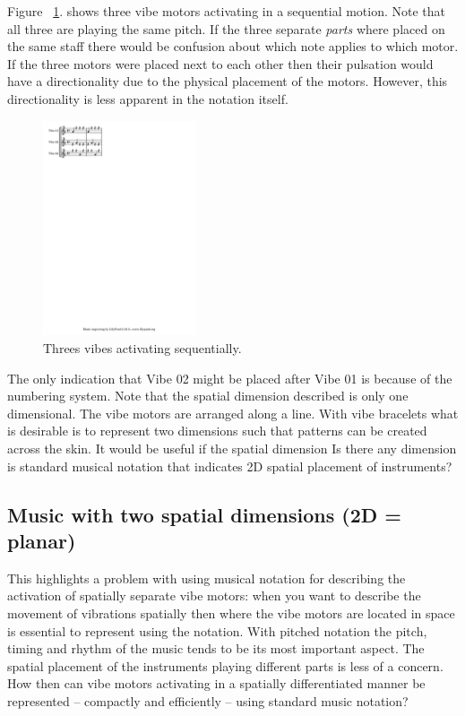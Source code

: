 \documentclass[a4paper, twocolumn]{article}
\begin{document}
Figure ~\ref{fig:arrowsMoving01}. shows three vibe motors activating in a sequential motion. Note that all three are playing the same pitch. If the three separate \textit{parts} where placed on the same staff there would be confusion about which note applies to which motor. If the three motors were placed next to each other then their pulsation would have a directionality due to the physical placement of the motors. However, this directionality is less apparent in the notation itself. 
\\

\begin{figure}[htb]
    \begin{center}
        \includegraphics[width=0.4\textwidth]{graphics/arrowsMoving-01.pdf}
    \end{center}
    \caption{Threes vibes activating sequentially.\label{fig:arrowsMoving01}}
\end{figure}

The only indication that Vibe 02 might be placed after Vibe 01 is because of the numbering system. Note that the spatial dimension described is only one dimensional. The vibe motors are arranged along a line. With vibe bracelets what is desirable is to represent two dimensions such that patterns can be created across the skin. It would be useful if the spatial dimension Is there any dimension is standard musical notation that indicates 2D spatial placement of instruments? 

\subsection{Music with two spatial dimensions (2D = planar)}

This highlights a problem with using musical notation for describing the activation of spatially separate vibe motors: when you want to describe the movement of vibrations spatially then where the vibe motors are located in space is essential to represent using the notation. With pitched notation the pitch, timing and rhythm of the music tends to be its most important aspect. The spatial placement of the instruments playing different parts is less of a concern. How then can vibe motors activating in a spatially differentiated manner be represented -- compactly and efficiently -- using standard music notation?\\
\end{document}
